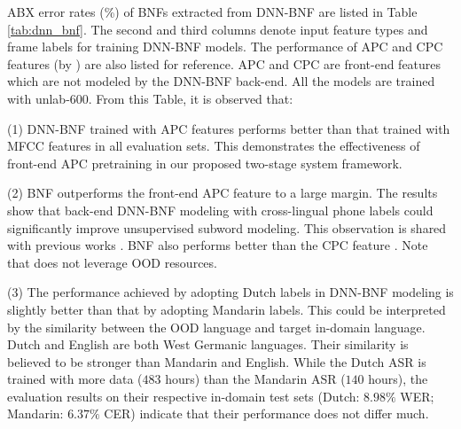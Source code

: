 \documentclass[a4paper]{article}
\begin{document}
ABX error rates (\%) of BNFs extracted from  DNN-BNF are listed in Table \ref{tab:dnn_bnf}. The second and third columns  denote input feature types and frame labels for training DNN-BNF models.
The performance  of    APC  and CPC features (by \cite{kahn2019librilight}) are also listed for reference. {\color{blue}APC and CPC are front-end features which are not modeled by the DNN-BNF back-end.}
All the models are trained with unlab-600.   From this Table, it is observed  that:

(1) DNN-BNF trained with APC features performs better than that trained with MFCC features in all evaluation sets. This  demonstrates the effectiveness of front-end APC pretraining in our proposed two-stage system framework.

(2) BNF outperforms the front-end APC  feature to a large margin. 
The results show that back-end DNN-BNF modeling with cross-lingual phone labels
could significantly improve unsupervised subword modeling. This observation is shared with previous works \cite{shibata2017composite,feng2019_TASLP}. BNF also performs better than the   CPC feature    \cite{kahn2019librilight}. Note that \cite{kahn2019librilight} does not leverage OOD resources.

(3) The performance achieved by adopting Dutch labels in DNN-BNF modeling is slightly better than that by adopting Mandarin labels. 
This could be interpreted by the similarity between the OOD language and target in-domain language. Dutch and English are both West Germanic languages. Their similarity is believed to be stronger than Mandarin and English. While the Dutch ASR  is trained with more data ($483$ hours) than the Mandarin ASR ($140$ hours), the evaluation results on their respective in-domain test sets (Dutch: $8.98\%$ WER; Mandarin: $6.37\%$ CER) indicate that their performance does not differ much.



\end{document}
